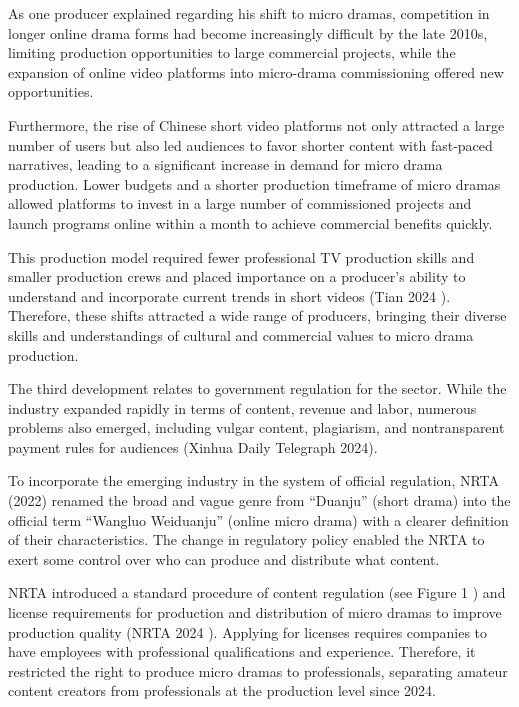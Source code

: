 \documentclass[10pt,a4paper]{article}
\begin{document}
As one producer explained regarding his shift to micro dramas, competition in longer online drama forms had become increasingly difficult by the late 2010s, limiting production opportunities to large commercial projects, while the expansion of online video platforms into micro-drama commissioning offered new opportunities.\par
Furthermore, the rise of Chinese short video platforms not only attracted a large number of users but also led audiences to favor shorter content with fast-paced narratives, leading to a significant increase in demand for micro drama production. Lower budgets and a shorter production timeframe of micro dramas allowed platforms to invest in a large number of commissioned projects and launch programs online within a month to achieve commercial benefits quickly.\par
This production model required fewer professional TV production skills and smaller production crews and placed importance on a producer’s ability to understand and incorporate current trends in short videos (Tian 2024 ). Therefore, these shifts attracted a wide range of producers, bringing their diverse skills and understandings of cultural and commercial values to micro drama production.\par
The third development relates to government regulation for the sector. While the industry expanded rapidly in terms of content, revenue and labor, numerous problems also emerged, including vulgar content, plagiarism, and nontransparent payment rules for audiences (Xinhua Daily Telegraph 2024).\par
To incorporate the emerging industry in the system of official regulation, NRTA (2022) renamed the broad and vague genre from “Duanju” (short drama) into the official term “Wangluo Weiduanju” (online micro drama) with a clearer definition of their characteristics. The change in regulatory policy enabled the NRTA to exert some control over who can produce and distribute what content.\par
NRTA introduced a standard procedure of content regulation (see Figure 1 ) and license requirements for production and distribution of micro dramas to improve production quality (NRTA 2024 ). Applying for licenses requires companies to have employees with professional qualifications and experience. Therefore, it restricted the right to produce micro dramas to professionals, separating amateur content creators from professionals at the production level since 2024.\par
\end{document}

